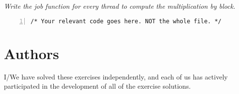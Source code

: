 \documentclass{article}
\begin{document}
\begin{ExerciseList}
\Exercise
{}
\Question
\emph{Write the job function for every thread to compute the
  multiplication by block.}

\begin{lstlisting}[basicstyle=\small\sffamily,
keywords={break,case,const,continue,default,else,enum,
for,if,return,switch,while,do,long,void,int,float,double,
char,struct,typedef,include,size\_t},
keywordstyle={\color{blue}},
comment={[l]{//}}, morecomment={[s]{/*}{*/}}, commentstyle=\itshape,
columns={[l]flexible}, numbers=left, numberstyle=\tiny,
frameround=fftt, frame=shadowbox, captionpos=b,
caption={Parallelized matrix multiplication by block.},
label=LST:blockmatmult]
/* Your relevant code goes here. NOT the whole file. */
\end{lstlisting}

\end{ExerciseList}


\newpage
\section{Authors}
I/We have solved these exercises independently, and each of us has actively
participated in the development of all of the exercise solutions.
\vspace{1cm}
\end{document}
